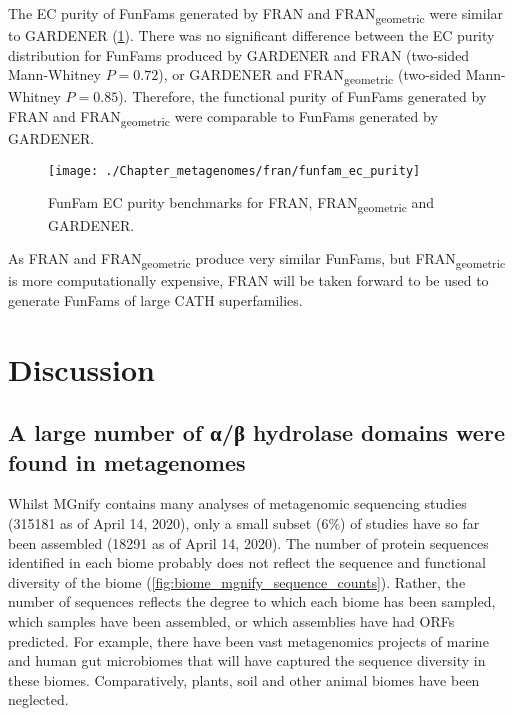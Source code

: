 The EC purity of FunFams generated by FRAN and FRAN\textsubscript{geometric} were similar to GARDENER (\ref{fig:fran-ec}).
There was no significant difference between the EC purity distribution for FunFams produced by GARDENER and FRAN (two-sided Mann-Whitney $P = 0.72$), or GARDENER and FRAN\textsubscript{geometric} (two-sided Mann-Whitney $P = 0.85$).
Therefore, the functional purity of FunFams generated by FRAN and FRAN\textsubscript{geometric} were comparable to FunFams generated by GARDENER.

\begin{figure}[!hbt]
    \centering
    \texttt{[image: ./Chapter\_metagenomes/fran/funfam\_ec\_purity]}
    \caption{%
        FunFam EC purity benchmarks for FRAN, FRAN\textsubscript{geometric} and GARDENER.
    }
    \label{fig:fran-ec}
\end{figure}

As FRAN and FRAN\textsubscript{geometric} produce very similar FunFams, but FRAN\textsubscript{geometric} is more computationally expensive, FRAN will be taken forward to be used to generate FunFams of large CATH superfamilies.

\section{Discussion}

\subsection{A large number of α/β hydrolase domains were found in metagenomes}

Whilst MGnify contains many analyses of metagenomic sequencing studies (\num{315181} as of April 14, 2020), only a small subset ($6\%$) of studies have so far been assembled (\num{18291} as of April 14, 2020). The number of protein sequences identified in each biome probably does not reflect the sequence and functional diversity of the biome (\ref{fig:biome_mgnify_sequence_counts}). Rather, the number of sequences reflects the degree to which each biome has been sampled, which samples have been assembled, or which assemblies have had ORFs predicted. For example, there have been vast metagenomics projects of marine \cite{Sunagawa2015} and human gut \cite{Almeida2019,Forster2019} microbiomes that will have captured the sequence diversity in these biomes. Comparatively, plants, soil and other animal biomes have been neglected.


